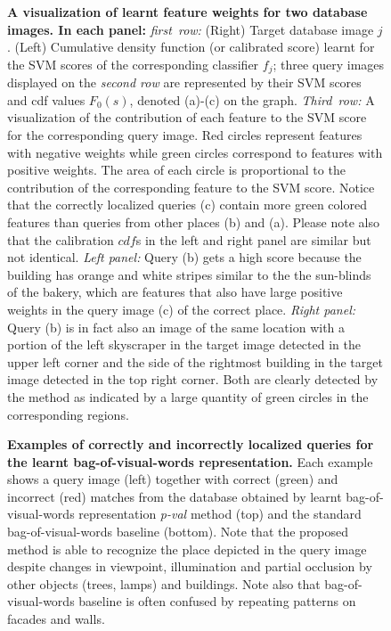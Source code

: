   \begin{figure}[tbp]
    
    \vspace*{-2mm}
    \caption{
          {\bf  A visualization of learnt feature weights for two database images. In each panel:} 
         \emph{first~row:} (Right) Target database image $j$. (Left) Cumulative density function (or calibrated score) learnt for the SVM scores of the corresponding classifier $f_j$;  three query images displayed on the \emph{second row} are represented by their SVM scores and cdf values $F_0(s)$, denoted (a)-(c) on the graph. \emph{Third~row:} A visualization of the contribution of each feature to the SVM score for the corresponding query image. Red circles represent features with negative weights while green circles correspond to features with positive weights. The area of each circle is proportional to the contribution of the corresponding feature to the SVM score.
         Notice that the correctly localized queries (c) contain more green colored features than queries from other places (b) and (a).
        	 Please note also that the calibration $cdf$s in the left and right panel are similar but not identical. 
         {\it Left panel:} Query (b) gets a high score because the building has orange and white stripes similar to the the sun-blinds of the bakery, which are features that also have large positive weights in the query image (c) of the correct place.
         {\it Right panel:} Query (b) is in fact also an image of the same location with a portion of the left skyscraper in the target image detected in the upper left corner and the side of the rightmost building in the target image detected in the top right corner. Both are clearly detected by the method as indicated by a large quantity of green circles in the corresponding regions.
    }
    \label{fig:3qVSw}
    \vspace*{2mm}
  \end{figure}


    \begin{figure}[t!]
      
      \caption{
          \textbf{Examples  of correctly and incorrectly localized queries for the learnt bag-of-visual-words representation.}
          Each example shows a query image (left) together with correct (green) and incorrect (red) matches from the database obtained by learnt bag-of-visual-words representation \emph{p-val} method (top) and the standard bag-of-visual-words baseline (bottom). Note that the proposed method is able to recognize the place depicted in the query image despite changes in viewpoint, illumination and partial occlusion by other objects (trees, lamps) and buildings. Note also that bag-of-visual-words baseline is often confused by repeating patterns on facades and walls. 
      }
      \label{fig:images}
    \end{figure}



